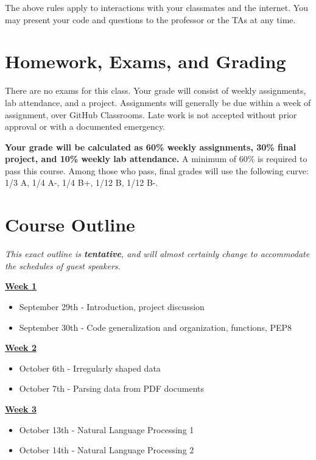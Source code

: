 \documentclass{article}
\begin{document}
The above rules apply to interactions with your classmates and the internet. You may present your code and questions to the professor or the TAs at any time.

\section*{Homework, Exams, and Grading}
There are no exams for this class.  Your grade will consist of weekly assignments, lab attendance, and a project.  Assignments will generally be due within a week of assignment, over GitHub Classrooms.  Late work is not accepted without prior approval or with a documented emergency.

\textbf{Your grade will be calculated as 60\% weekly assignments, 30\% final project, and 10\% weekly lab attendance.}  A minimum of 60\% is required to pass this course.  Among those who pass, final grades will use the following curve: 1/3 A, 1/4 A-, 1/4 B+, 1/12 B, 1/12 B-.

\section*{Course Outline}

\textit{This exact outline is \textbf{tentative}, and will almost certainly change to accommodate the schedules of guest speakers.}\\
\smallskip

\noindent
\textbf{\underline{Week 1}}
\begin{itemize}
\item September 29th - Introduction, project discussion
\item September 30th - Code generalization and organization, functions, PEP8
\end{itemize}
\bigskip

\noindent
\textbf{\underline{Week 2}}
\begin{itemize}
\item October 6th - Irregularly shaped data
\item October 7th - Parsing data from PDF documents
\end{itemize}
\bigskip

\noindent
\textbf{\underline{Week 3}}
\begin{itemize}
\item October 13th - Natural Language Processing 1
\item October 14th - Natural Language Processing 2
\end{itemize}
\bigskip
\end{document}
